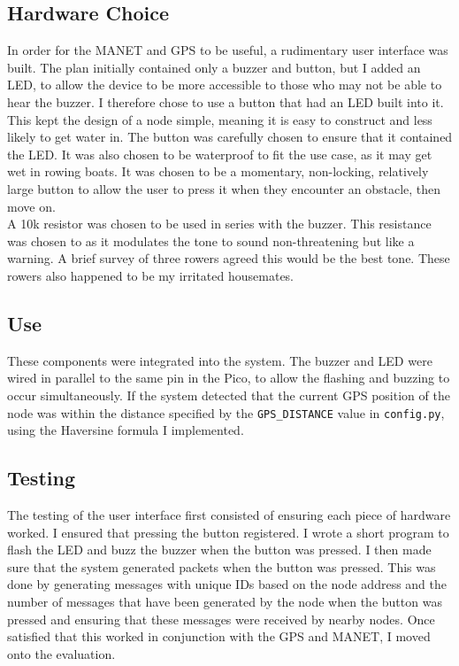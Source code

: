 \documentclass[12pt,a4paper]{report}
\begin{document}
{\subsection{Hardware Choice}
In order for the MANET and GPS to be useful, a rudimentary user interface was built. The plan initially contained only a buzzer and button, but I added an LED, to allow the device to be more accessible to those who may not be able to hear the buzzer. 
I therefore chose to use a button that had an LED built into it. This kept the design of a node simple, meaning it is easy to construct and less likely to get water in. The button was carefully chosen to ensure that it contained the LED. It was also chosen to be waterproof to fit the use case, as it may get wet in rowing boats. It was chosen to be a momentary, non-locking, relatively large button to allow the user to press it when they encounter an obstacle, then move on. \\
A 10k resistor was chosen to be used in series with the buzzer. This resistance was chosen to as it modulates the tone to sound non-threatening but like a warning. A brief survey of three rowers agreed this would be the best tone. These rowers also happened to be my irritated housemates. 

\subsection{Use}
These components were integrated into the system. The buzzer and LED were wired in parallel to the same pin in the Pico, to allow the flashing and buzzing to occur simultaneously. If the system detected that the current GPS position of the node was within the distance specified by the \verb'GPS_DISTANCE' value in \verb'config.py', using the Haversine formula I implemented.

\subsection{Testing}
The testing of the user interface first consisted of ensuring each piece of hardware worked. I ensured that pressing the button registered. I wrote a short program to flash the LED and buzz the buzzer when the button was pressed. I then made sure that the system generated packets when the button was pressed. This was done by generating messages with unique IDs based on the node address and the number of messages that have been generated by the node when the button was pressed and ensuring that these messages were received by nearby nodes. Once satisfied that this worked in conjunction with the GPS and MANET, I moved onto the evaluation. 


}
\end{document}
